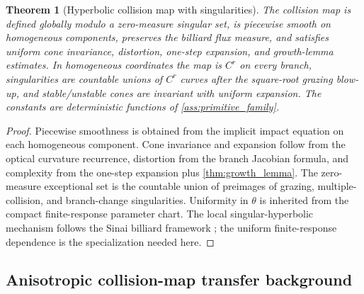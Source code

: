 \documentclass[11pt]{amsart}
\theoremstyle{compactplain}
\newtheorem{theorem}{Theorem}[section]
\theoremstyle{compactdefinition}
\theoremstyle{compactremark}
\begin{document}
\begin{theorem}[Hyperbolic collision map with singularities]
\label{thm:singular_collision_map}
The collision map is defined globally modulo a zero-measure singular set, is
piecewise smooth on homogeneous components, preserves the billiard flux measure,
and satisfies uniform cone invariance, distortion, one-step expansion, and
growth-lemma estimates.  In homogeneous coordinates the map is $C^r$ on every
branch, singularities are countable unions of $C^r$ curves after the square-root
grazing blow-up, and stable/unstable cones are invariant with uniform expansion.
The constants are deterministic functions of \cref{ass:primitive_family}.
\end{theorem}

\begin{proof}
Piecewise smoothness is obtained from the implicit impact equation on each
homogeneous component.  Cone invariance and expansion follow from the optical
curvature recurrence, distortion from the branch Jacobian formula, and
complexity from the one-step expansion plus \cref{thm:growth_lemma}.  The
zero-measure exceptional set is the countable union of preimages of grazing,
multiple-collision, and branch-change singularities.  Uniformity in $\theta$ is
inherited from the compact finite-response parameter chart.  The local
singular-hyperbolic mechanism follows the Sinai billiard framework
\cite{Sinai1970,KatokStrelcyn1986,chernov2006chaotic}; the uniform
finite-response dependence is the specialization needed here.
\end{proof}

\subsection{Anisotropic collision-map transfer background}
\end{document}
